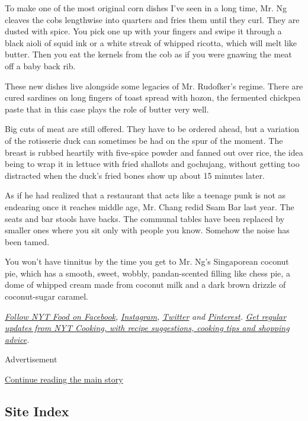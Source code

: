 To make one of the most original corn dishes I've seen in a long time,
Mr. Ng cleaves the cobs lengthwise into quarters and fries them until
they curl. They are dusted with spice. You pick one up with your fingers
and swipe it through a black aioli of squid ink or a white streak of
whipped ricotta, which will melt like butter. Then you eat the kernels
from the cob as if you were gnawing the meat off a baby back rib.

These new dishes live alongside some legacies of Mr. Rudofker's regime.
There are cured sardines on long fingers of toast spread with hozon, the
fermented chickpea paste that in this case plays the role of butter very
well.

Big cuts of meat are still offered. They have to be ordered ahead, but a
variation of the rotisserie duck can sometimes be had on the spur of the
moment. The breast is rubbed heartily with five-spice powder and fanned
out over rice, the idea being to wrap it in lettuce with fried shallots
and gochujang, without getting too distracted when the duck's fried
bones show up about 15 minutes later.

As if he had realized that a restaurant that acts like a teenage punk is
not as endearing once it reaches middle age, Mr. Chang redid Ssam Bar
last year. The seats and bar stools have backs. The communal tables have
been replaced by smaller ones where you sit only with people you know.
Somehow the noise has been tamed.

You won't have tinnitus by the time you get to Mr. Ng's Singaporean
coconut pie, which has a smooth, sweet, wobbly, pandan-scented filling
like chess pie, a dome of whipped cream made from coconut milk and a
dark brown drizzle of coconut-sugar caramel.

\emph{\href{https://www.facebookcorewwwi.onion/nytfood/}{Follow NYT Food
on Facebook},} \emph{\href{https://instagram.com/nytfood}{Instagram},}
\emph{\href{https://twitter.com/nytfood}{Twitter}} \emph{and}
\emph{\href{https://www.pinterest.com/nytfood/}{Pinterest}.}
\emph{\href{https://www.nytimes3xbfgragh.onion/newsletters/cooking}{Get
regular updates from NYT Cooking, with recipe suggestions, cooking tips
and shopping advice}.}

Advertisement

\protect\hyperlink{after-bottom}{Continue reading the main story}

\hypertarget{site-index}{%
\subsection{Site Index}\label{site-index}}


